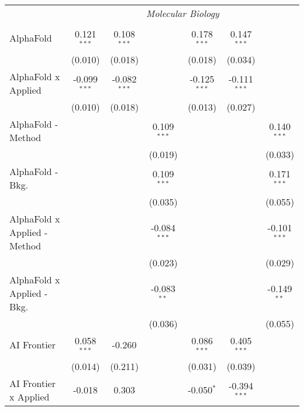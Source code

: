 \begin{tabular}{lcccccc}
 & \multicolumn{6}{c}{\textit{Molecular Biology}} \\ \\
   AlphaFold                      & 0.121$^{***}$  & 0.108$^{***}$  &                & 0.178$^{***}$  & 0.147$^{***}$  &   \\   
                                  & (0.010)        & (0.018)        &                & (0.018)        & (0.034)        &   \\   
   AlphaFold x Applied            & -0.099$^{***}$ & -0.082$^{***}$ &                & -0.125$^{***}$ & -0.111$^{***}$ &   \\   
                                  & (0.010)        & (0.018)        &                & (0.013)        & (0.027)        &   \\   
   AlphaFold - Method             &                &                & 0.109$^{***}$  &                &                & 0.140$^{***}$\\   
                                  &                &                & (0.019)        &                &                & (0.033)\\   
   AlphaFold - Bkg.               &                &                & 0.109$^{***}$  &                &                & 0.171$^{***}$\\   
                                  &                &                & (0.035)        &                &                & (0.055)\\   
   AlphaFold x Applied - Method   &                &                & -0.084$^{***}$ &                &                & -0.101$^{***}$\\   
                                  &                &                & (0.023)        &                &                & (0.029)\\   
   AlphaFold x Applied - Bkg.     &                &                & -0.083$^{**}$  &                &                & -0.149$^{**}$\\   
                                  &                &                & (0.036)        &                &                & (0.055)\\   
   AI Frontier                    & 0.058$^{***}$  & -0.260         &                & 0.086$^{***}$  & 0.405$^{***}$  &   \\   
                                  & (0.014)        & (0.211)        &                & (0.031)        & (0.039)        &   \\   
   AI Frontier x Applied          & -0.018         & 0.303          &                & -0.050$^{*}$   & -0.394$^{***}$ &   \\   

\end{tabular}
